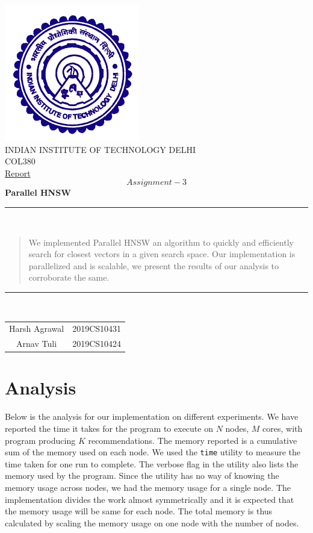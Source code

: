 \documentclass[hidelinks,12pt]{article}
\begin{document}
\begin{titlepage}
  \centering
  \includegraphics[scale=0.5]{iitdlogo.png}\\[1.0cm]
  \Large INDIAN INSTITUTE OF TECHNOLOGY DELHI\\[1.0 cm]
  \LARGE COL380\\[0.1cm]
  \Large \underline{Report}\\
  \large \[Assignment-3\]
  \LARGE \textbf{Parallel HNSW}


  \rule{\textwidth}{0.2 mm} \\[0.1cm]
  \begin{abstract}
    We implemented Parallel HNSW an algorithm to quickly and efficiently search for closest vectors
    in a given search space. Our implementation is parallelized and is scalable, we present the results of
    our analysis to corroborate the same.
    \\[0.1cm]
  \end{abstract}
  \rule{\textwidth}{0.2 mm} \\[0.1cm]
  \begin{flushright}

    \begin{tabular}{c|c}
      \small {Harsh Agrawal} & \small {2019CS10431} \\
      \small {Arnav Tuli}    & \small {2019CS10424} \\
    \end{tabular}
  \end{flushright}
\end{titlepage}

\section{Analysis}
Below is the analysis for our implementation on different experiments.
We have reported the time it takes for the program to execute on $N$ nodes, $M$ cores,
with program producing $K$ recommendations. The memory reported is a cumulative sum of the memory used on each node.
We used the \verb|time| utility to measure the time taken for one run to complete. The verbose
flag in the utility also lists the memory used by the program. Since the utility has no way of knowing the memory usage
across nodes, we had the memory usage for a single node. The implementation divides the work almost symmetrically and
it is expected that the memory usage will be same for each node. The total memory is thus calculated by scaling the memory usage
on one node with the number of nodes.
\end{document}
